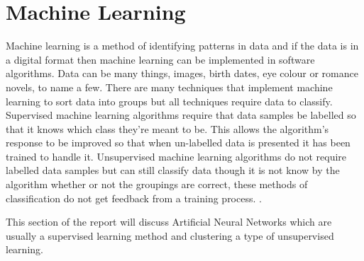 \section{Machine Learning}

Machine learning is a method of identifying patterns in data and if the data is in a digital format then machine learning can be implemented in software algorithms. Data can be many things, images, birth dates, eye colour or romance novels, to name a few. There are many techniques that implement machine learning to sort data into groups but all techniques require data to classify. Supervised machine learning algorithms require that data samples be labelled so that it knows which class they're meant to be. This allows the algorithm's response to be improved so that when un-labelled data is presented it has been trained to handle it. Unsupervised machine learning algorithms do not require labelled data samples but can still classify data though it is not know by the algorithm whether or not the groupings are correct, these methods of classification do not get feedback from a training process. \cite{patterns_machine_learning}.

This section of the report will discuss Artificial Neural Networks which are usually a supervised learning method and clustering a type of unsupervised learning.


